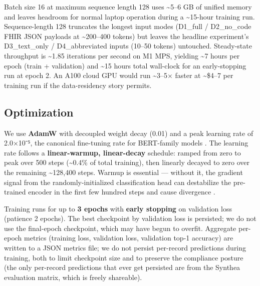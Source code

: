 Batch size 16 at maximum sequence length 128 uses \textasciitilde5--6 GB of
unified memory and leaves headroom for normal laptop operation
during a \textasciitilde15-hour training run. Sequence-length 128 truncates the
longest input modes (D1\_full / D2\_no\_code FHIR JSON payloads at
\textasciitilde200--400 tokens) but leaves the headline experiment's
D3\_text\_only / D4\_abbreviated inputs (10--50 tokens) untouched.
Steady-state throughput is \textasciitilde1.85 iterations per second on M1 MPS,
yielding \textasciitilde7 hours per epoch (train + validation) and \textasciitilde15 hours
total wall-clock for an early-stopping run at epoch 2. An A100
cloud GPU would run \textasciitilde3--5× faster at \textasciitilde\$4--7 per training run if
the data-residency story permits.

\subsection{Optimization}\label{optimization}

We use \textbf{AdamW} \autocite{Loshchilov2019} with decoupled weight decay
(0.01) and a peak learning rate of 2.0×10⁻⁵, the canonical
fine-tuning rate for BERT-family models \autocite{Devlin2019}. The
learning rate follows a \textbf{linear-warmup, linear-decay} schedule:
ramped from zero to peak over 500 steps (\textasciitilde0.4\% of total training),
then linearly decayed to zero over the remaining \textasciitilde128,400 steps.
Warmup is essential --- without it, the gradient signal from the
randomly-initialized classification head can destabilize the
pre-trained encoder in the first few hundred steps and cause
divergence \autocite{Liu2020}.

Training runs for up to \textbf{3 epochs} with \textbf{early stopping} on
validation loss (patience 2 epochs). The best checkpoint by
validation loss is persisted; we do not use the final-epoch
checkpoint, which may have begun to overfit. Aggregate per-epoch
metrics (training loss, validation loss, validation top-1
accuracy) are written to a JSON metrics file; we do not persist
per-record predictions during training, both to limit checkpoint
size and to preserve the compliance posture (the only per-record
predictions that ever get persisted are from the Synthea
evaluation matrix, which is freely shareable).
